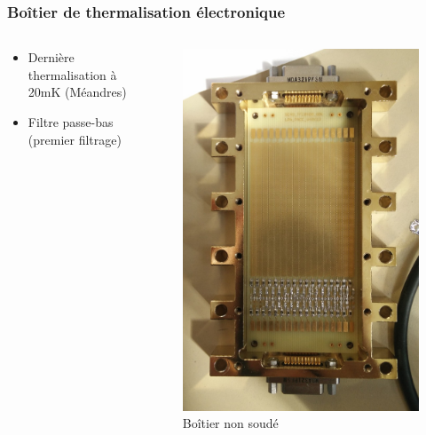 \documentclass[10pt,a9paper,handout]{beamer} \usepackage[utf8]{inputenc} \usepackage[francais]{babel} \usepackage[T1]{fontenc}
\begin{document}
\begin{frame}
\frametitle{Boîtier de thermalisation électronique}
\begin{columns}
\begin{column}{0.6\textwidth}
    \begin{itemize}
        \item Dernière thermalisation à 20mK (Méandres)
        \vspace*{2mm}
        \item Filtre passe-bas (premier filtrage)
    \end{itemize}
\end{column}
\begin{column}{0.3\textwidth}
\begin{figure}[h]
    \begin{center}
        \includegraphics[width=\textwidth]{Images/Thermalisation/DC3_non_rotate}
        \caption{Boîtier non soudé}
    \end{center}
\end{figure}
\end{column}
\end{columns}

\end{frame}
\end{document}
